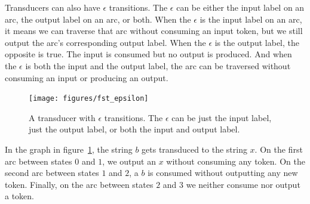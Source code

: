 \documentclass[main.tex]{subfiles}
\begin{document}
Transducers can also have $\epsilon$ transitions. The $\epsilon$ can be either
the input label on an arc, the output label on an arc, or both. When the
$\epsilon$ is the input label on an arc, it means we can traverse that arc
without consuming an input token, but we still output the arc's corresponding
output label. When the $\epsilon$ is the output label, the opposite is true.
The input is consumed but no output is produced. And when the $\epsilon$ is
both the input and the output label, the arc can be traversed without consuming
an input or producing an output.

\begin{figure}
    \centering
    \texttt{[image: figures/fst\_epsilon]}
    \caption{A transducer with $\epsilon$ transitions. The $\epsilon$ can be
    just the input label, just the output label, or both the input and output
    label.}
    \label{fig:fst_epsilon}
\end{figure}

In the graph in figure~\ref{fig:fst_epsilon}, the string $b$ gets transduced to
the string $x$. On the first arc between states $0$ and $1$, we output an $x$
without consuming any token. On the second arc between states $1$ and $2$, a
$b$ is consumed without outputting any new token. Finally, on the arc between
states $2$ and $3$ we neither consume nor output a token.
\end{document}
